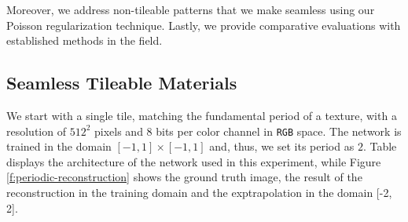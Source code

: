 Moreover, we address non-tileable patterns that we make seamless using our Poisson regularization technique. Lastly, we provide comparative evaluations with established methods in the field.

\subsection{Seamless Tileable Materials}\label{s-multires-2d}

We start with a single tile, matching the fundamental period of a texture, with a resolution of $512^2$ pixels and $8$ bits per color channel in \texttt{RGB} space. The network is trained in the domain $[-1, 1] \times [-1, 1]$ and, thus, we set its period as $2$. Table  displays the architecture of the network used in this experiment, while Figure \ref{f:periodic-reconstruction} shows the ground truth image, the result of the reconstruction in the training domain and the exptrapolation in the domain [-2, 2].




